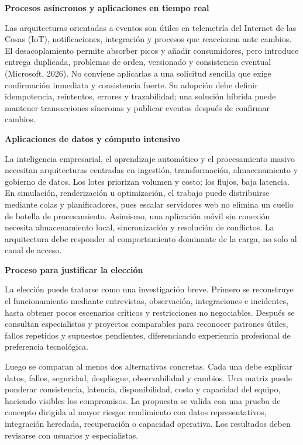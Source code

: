 \documentclass[12pt,letterpaper]{article}
\begin{document}
\textbf{Procesos asíncronos y aplicaciones en tiempo real}\par
Las arquitecturas orientadas a eventos son útiles en telemetría del Internet de las Cosas (IoT), notificaciones, integración y procesos que reaccionan ante cambios. El desacoplamiento permite absorber picos y añadir consumidores, pero introduce entrega duplicada, problemas de orden, versionado y consistencia eventual (Microsoft, 2026). No conviene aplicarlas a una solicitud sencilla que exige confirmación inmediata y consistencia fuerte. Su adopción debe definir idempotencia, reintentos, errores y trazabilidad; una solución híbrida puede mantener transacciones síncronas y publicar eventos después de confirmar cambios.

\textbf{Aplicaciones de datos y cómputo intensivo}\par
La inteligencia empresarial, el aprendizaje automático y el procesamiento masivo necesitan arquitecturas centradas en ingestión, transformación, almacenamiento y gobierno de datos. Los lotes priorizan volumen y costo; los flujos, baja latencia. En simulación, renderización u optimización, el trabajo puede distribuirse mediante colas y planificadores, pues escalar servidores web no elimina un cuello de botella de procesamiento. Asimismo, una aplicación móvil sin conexión necesita almacenamiento local, sincronización y resolución de conflictos. La arquitectura debe responder al comportamiento dominante de la carga, no solo al canal de acceso.

\textbf{Proceso para justificar la elección}\par
La elección puede tratarse como una investigación breve. Primero se reconstruye el funcionamiento mediante entrevistas, observación, integraciones e incidentes, hasta obtener pocos escenarios críticos y restricciones no negociables. Después se consultan especialistas y proyectos comparables para reconocer patrones útiles, fallos repetidos y supuestos pendientes, diferenciando experiencia profesional de preferencia tecnológica.

Luego se comparan al menos dos alternativas concretas. Cada una debe explicar datos, fallos, seguridad, despliegue, observabilidad y cambios. Una matriz puede ponderar consistencia, latencia, disponibilidad, costo y capacidad del equipo, haciendo visibles los compromisos. La propuesta se valida con una prueba de concepto dirigida al mayor riesgo: rendimiento con datos representativos, integración heredada, recuperación o capacidad operativa. Los resultados deben revisarse con usuarios y especialistas.
\end{document}

